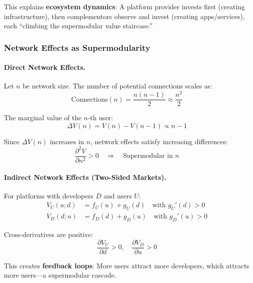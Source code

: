 This explains \textbf{ecosystem dynamics}: A platform provider invests first (creating 
infrastructure), then complementors observe and invest (creating apps/services), 
each ``climbing the supermodular value staircase.''

\subsubsection{Network Effects as Supermodularity}

\paragraph{Direct Network Effects.}

Let $n$ be network size. The number of potential connections scales as:
\begin{equation}
\text{Connections}(n) = \frac{n(n-1)}{2} \approx \frac{n^2}{2}
\end{equation}

The marginal value of the $n$-th user:
\begin{equation}
\Delta V(n) = V(n) - V(n-1) \propto n - 1
\end{equation}

Since $\Delta V(n)$ increases in $n$, network effects satisfy increasing differences:
\begin{equation}
\frac{\partial^2 V}{\partial n^2} > 0 \quad \Rightarrow \quad \text{Supermodular in } n
\end{equation}

\paragraph{Indirect Network Effects (Two-Sided Markets).}

For platforms with developers $D$ and users $U$:
\begin{align}
V_U(u; d) &= f_U(u) + g_U(d) \quad \text{with } g_U'(d) > 0 \\
V_D(d; u) &= f_D(d) + g_D(u) \quad \text{with } g_D'(u) > 0
\end{align}

Cross-derivatives are positive:
\begin{equation}
\frac{\partial V_U}{\partial d} > 0, \quad \frac{\partial V_D}{\partial u} > 0
\end{equation}

This creates \textbf{feedback loops}: More users attract more developers, which 
attracts more users---a supermodular cascade.

